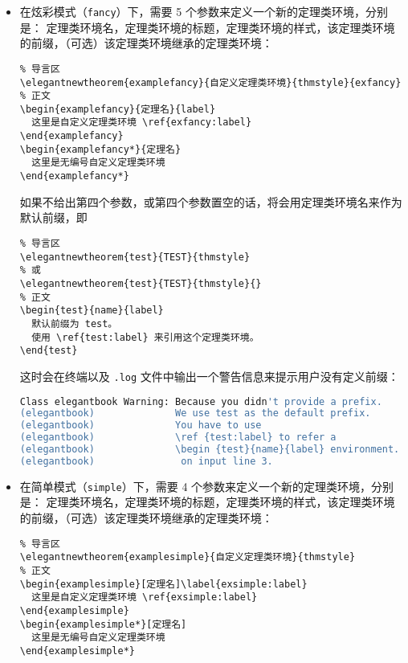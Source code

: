 \documentclass[lang=cn,newtx,10pt,scheme=chinese,color=black]{elegantbook}
\begin{document}
\begin{itemize}
  \item 在炫彩模式（\lstinline{fancy}）下，需要 5 个参数来定义一个新的定理类环境，分别是：
  定理类环境名，定理类环境的标题，定理类环境的样式，该定理类环境的前缀，（可选）该定理类环境继承的定理类环境：

\begin{lstlisting}
% 导言区
\elegantnewtheorem{examplefancy}{自定义定理类环境}{thmstyle}{exfancy}
% 正文
\begin{examplefancy}{定理名}{label}
  这里是自定义定理类环境 \ref{exfancy:label}
\end{examplefancy}
\begin{examplefancy*}{定理名}
  这里是无编号自定义定理类环境
\end{examplefancy*}
\end{lstlisting}

  如果不给出第四个参数，或第四个参数置空的话，将会用定理类环境名来作为默认前缀，即
\begin{lstlisting}
% 导言区
\elegantnewtheorem{test}{TEST}{thmstyle}
% 或
\elegantnewtheorem{test}{TEST}{thmstyle}{}
% 正文
\begin{test}{name}{label}
  默认前缀为 test。
  使用 \ref{test:label} 来引用这个定理类环境。
\end{test}
\end{lstlisting}

这时会在终端以及 \verb|.log| 文件中输出一个警告信息来提示用户没有定义前缀：

\begin{lstlisting}[language=bash]
Class elegantbook Warning: Because you didn't provide a prefix. 
(elegantbook)              We use test as the default prefix. 
(elegantbook)              You have to use 
(elegantbook)              \ref {test:label} to refer a 
(elegantbook)              \begin {test}{name}{label} environment. 
(elegantbook)               on input line 3.
\end{lstlisting}

  \item 在简单模式（\lstinline{simple}）下，需要 4 个参数来定义一个新的定理类环境，分别是：
  定理类环境名，定理类环境的标题，定理类环境的样式，该定理类环境的前缀，（可选）该定理类环境继承的定理类环境：
\begin{lstlisting}
% 导言区
\elegantnewtheorem{examplesimple}{自定义定理类环境}{thmstyle}
% 正文
\begin{examplesimple}[定理名]\label{exsimple:label}
  这里是自定义定理类环境 \ref{exsimple:label}
\end{examplesimple}
\begin{examplesimple*}[定理名]
  这里是无编号自定义定理类环境
\end{examplesimple*}
\end{lstlisting}


\end{itemize}
\end{document}

